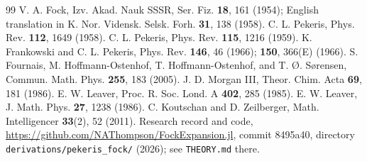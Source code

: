 \documentclass[aps,pra,twocolumn,superscriptaddress,nofootinbib]{revtex4-2}
\theoremstyle{remark}
\begin{document}
\begin{thebibliography}{99}
 V. A. Fock, Izv. Akad. Nauk SSSR, Ser. Fiz. \textbf{18}, 161 (1954); English translation in K. Nor. Vidensk. Selsk. Forh. \textbf{31}, 138 (1958). %
 C. L. Pekeris, Phys. Rev. \textbf{112}, 1649 (1958).
 C. L. Pekeris, Phys. Rev. \textbf{115}, 1216 (1959).
 K. Frankowski and C. L. Pekeris, Phys. Rev. \textbf{146}, 46 (1966); \textbf{150}, 366(E) (1966).
 S. Fournais, M. Hoffmann-Ostenhof, T. Hoffmann-Ostenhof, and T. \O. S\o rensen, Commun. Math. Phys. \textbf{255}, 183 (2005).
 J. D. Morgan III, Theor. Chim. Acta \textbf{69}, 181 (1986).
 E. W. Leaver, Proc. R. Soc. Lond. A \textbf{402}, 285 (1985).
 E. W. Leaver, J. Math. Phys. \textbf{27}, 1238 (1986).
 C. Koutschan and D. Zeilberger, Math. Intelligencer \textbf{33}(2), 52 (2011).
 Research record and code, \url{https://github.com/NAThompson/FockExpansion.jl}, commit 8495a40, directory \texttt{derivations/pekeris\_fock/} (2026); see \texttt{THEORY.md} there. %
\end{thebibliography}
\end{document}
